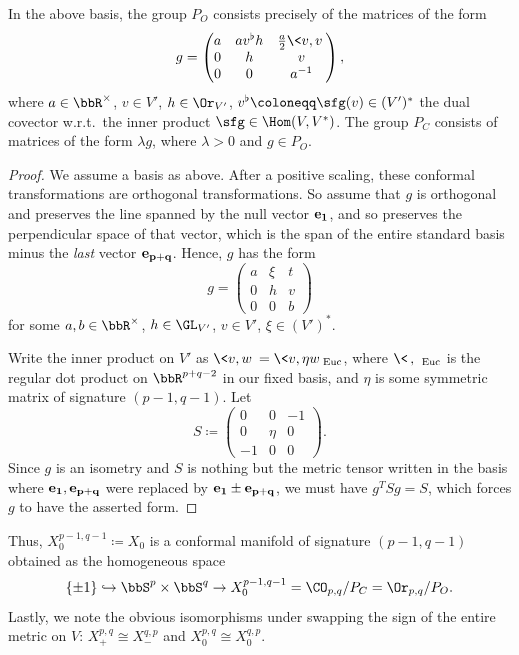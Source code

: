 \begin{lem}
    In the above basis, the group $P_O$ consists precisely of the matrices of the form 
    \[g=\begin{pmatrix}
        a & av^\flat h & \frac{a}{2}\<v,v\>\\
        0 & h & v \\
        0 & 0 & a^{-1}
    \end{pmatrix},\]
    where $a\in \bbR^\times$, $v\in V'$, $h\in \Or_{V'}$, $v^\flat\coloneqq \sfg(v)\in (V')^\ast$ the dual covector w.r.t.\ the inner product $\sfg\in \Hom(V,V^\ast)$.  The group $P_C$ consists of matrices of the form $\lambda g$, where $\lambda>0$ and $g\in P_O$.
\end{lem}
\begin{proof}
    We assume a basis as above. After a positive scaling, these conformal transformations are orthogonal transformations. So assume that $g$ is orthogonal and preserves the line spanned by the null vector $\bf{e}_1$, and so preserves the perpendicular space of that vector, which is the span of the entire standard basis minus the \emph{last} vector $\bf{e}_{p+q}$. Hence, $g$ has the form 
    \[g=\begin{pmatrix}
        a & \xi & t\\
        0 & h & v\\
        0 & 0 & b
    \end{pmatrix}\]
    for some $a,b\in \bbR^\times$, $h\in \GL_{V'}$, $v\in V'$, $\xi\in (V')^\ast$.

    Write the inner product on $V'$ as $\<v,w\>=\<v,\eta w\>_{\mathrm{Euc}}$, where $\<\,,\,\>_{\mathrm{Euc}}$ is the regular dot product on $\bbR^{p+q-2}$ in our fixed basis, and $\eta$ is some symmetric matrix of signature $(p-1,q-1)$. Let 
    \[S\coloneqq \begin{pmatrix}
        0 & 0 & -1\\
        0 & \eta & 0 \\
        -1 & 0 & 0
    \end{pmatrix}.\]
    Since $g$ is an isometry and $S$ is nothing but the metric tensor written in the basis where $\bf{e}_1,\bf{e}_{p+q}$ were replaced by $\bf{e}_1\pm \bf{e}_{p+q}$, we must have $g^T Sg=S$, which forces $g$ to have the asserted form.
\end{proof}

Thus, $X_0^{p-1,q-1}\coloneqq X_0$ is a conformal manifold of signature $(p-1,q-1)$ obtained as the homogeneous space 
\[\{\pm 1\}\hookrightarrow \bbS^p\times\bbS^q\to X_0^{p-1,q-1}=\CO_{p,q}\slash P_C=\Or_{p,q}\slash P_O.\]
Lastly, we note the obvious isomorphisms under swapping the sign of the entire metric on $V$: $X_+^{p,q}\cong X_-^{q,p}$ and $X_0^{p,q}\cong X_0^{q,p}$.











